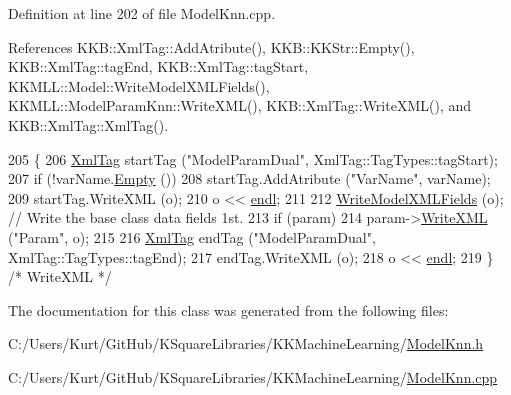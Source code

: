 Definition at line 202 of file Model\+Knn.\+cpp.



References K\+K\+B\+::\+Xml\+Tag\+::\+Add\+Atribute(), K\+K\+B\+::\+K\+K\+Str\+::\+Empty(), K\+K\+B\+::\+Xml\+Tag\+::tag\+End, K\+K\+B\+::\+Xml\+Tag\+::tag\+Start, K\+K\+M\+L\+L\+::\+Model\+::\+Write\+Model\+X\+M\+L\+Fields(), K\+K\+M\+L\+L\+::\+Model\+Param\+Knn\+::\+Write\+X\+M\+L(), K\+K\+B\+::\+Xml\+Tag\+::\+Write\+X\+M\+L(), and K\+K\+B\+::\+Xml\+Tag\+::\+Xml\+Tag().


\begin{DoxyCode}
205 \{
206   \hyperlink{class_k_k_b_1_1_xml_tag}{XmlTag}  startTag (\textcolor{stringliteral}{"ModelParamDual"},  XmlTag::TagTypes::tagStart);
207   \textcolor{keywordflow}{if}  (!varName.\hyperlink{class_k_k_b_1_1_k_k_str_ac69942f73fffd672ec2a6e1c410afdb6}{Empty} ())
208     startTag.AddAtribute (\textcolor{stringliteral}{"VarName"}, varName);
209   startTag.WriteXML (o);
210   o << \hyperlink{namespace_k_k_b_ad1f50f65af6adc8fa9e6f62d007818a8}{endl};
211 
212   \hyperlink{class_k_k_m_l_l_1_1_model_a560829876c8ca002f00592e428a780a2}{WriteModelXMLFields} (o); \textcolor{comment}{// Write the base class data fields 1st.}
213   \textcolor{keywordflow}{if}  (param)
214     param->\hyperlink{class_k_k_m_l_l_1_1_model_param_knn_a69fd33f58382121ab5137d6d912f2610}{WriteXML} (\textcolor{stringliteral}{"Param"}, o);
215 
216   \hyperlink{class_k_k_b_1_1_xml_tag}{XmlTag}  endTag (\textcolor{stringliteral}{"ModelParamDual"}, XmlTag::TagTypes::tagEnd);
217   endTag.WriteXML (o);
218   o << \hyperlink{namespace_k_k_b_ad1f50f65af6adc8fa9e6f62d007818a8}{endl};
219 \}  \textcolor{comment}{/* WriteXML */}
\end{DoxyCode}


The documentation for this class was generated from the following files\+:\begin{DoxyCompactItemize}
\item 
C\+:/\+Users/\+Kurt/\+Git\+Hub/\+K\+Square\+Libraries/\+K\+K\+Machine\+Learning/\hyperlink{_model_knn_8h}{Model\+Knn.\+h}\item 
C\+:/\+Users/\+Kurt/\+Git\+Hub/\+K\+Square\+Libraries/\+K\+K\+Machine\+Learning/\hyperlink{_model_knn_8cpp}{Model\+Knn.\+cpp}\end{DoxyCompactItemize}
